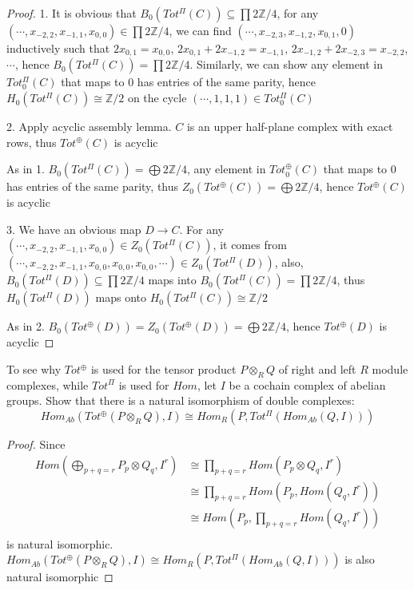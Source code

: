 \documentclass{article}
\newenvironment{exercise}[2][Exercise]{\begin{trivlist}
\item[\hskip \labelsep {\bfseries #1}\hskip \labelsep {\bfseries #2.}]}{\end{trivlist}}
\theoremstyle{definition}
\theoremstyle{remark}
\theoremstyle{definition}
\begin{document}
\begin{proof}
1. It is obvious that $B_0(Tot^\Pi(C))\subseteq\prod2\mathbb Z/4$, for any $(\cdots,x_{-2,2},x_{-1,1},x_{0,0})\in\prod2\mathbb Z/4$, we can find $(\cdots,x_{-2,3},x_{-1,2},x_{0,1},0)$ inductively such that $2x_{0,1}=x_{0,0}$, $2x_{0,1}+2x_{-1,2}=x_{-1,1}$, $2x_{-1,2}+2x_{-2,3}=x_{-2,2}$, $\cdots$, hence $B_0(Tot^\Pi(C))=\prod2\mathbb Z/4$. Similarly, we can show any element in $Tot^\Pi_0(C)$ that maps to $0$ has entries of the same parity, hence $H_0(Tot^\Pi(C))\cong\mathbb Z/2$ on the cycle $(\cdots,1,1,1)\in Tot^\Pi_0(C)$ \par
2. Apply acyclic assembly lemma. $C$ is an upper half-plane complex with exact rows, thus $Tot^\oplus(C)$ is acyclic \par
As in 1. $B_0(Tot^\Pi(C))=\bigoplus 2\mathbb Z/4$, any element in $Tot^\oplus_0(C)$ that maps to $0$ has entries of the same parity, thus $Z_0(Tot^\oplus(C))=\bigoplus 2\mathbb Z/4$, hence $Tot^\oplus(C)$ is acyclic \par
3. We have an obvious map $D\to C$. For any $(\cdots,x_{-2,2},x_{-1,1},x_{0,0})\in Z_0(Tot^\Pi(C))$, it comes from $(\cdots,x_{-2,2},x_{-1,1},x_{0,0},x_{0,0},x_{0,0},\cdots)\in Z_0(Tot^\Pi(D))$, also, $B_0(Tot^\Pi(D))\subseteq\prod2\mathbb Z/4$ maps into $B_0(Tot^\Pi(C))=\prod2\mathbb Z/4$, thus  $H_0(Tot^\Pi(D))$ maps onto $H_0(Tot^\Pi(C))\cong\mathbb Z/2$ \par
As in 2. $B_0(Tot^\oplus(D))=Z_0(Tot^\oplus(D))=\bigoplus 2\mathbb Z/4$, hence $Tot^\oplus(D)$ is acyclic 
\end{proof}

\begin{exercise}{\textbf{2.7.3}}
To see why $Tot^\oplus$ is used for the tensor product $P\otimes_R Q$ of right and left $R$ module complexes, while $Tot^\Pi$ is used for $Hom$, let $I$ be a cochain complex of abelian groups. Show that there is a natural isomorphism of double complexes:
\[Hom_{Ab}(Tot^\oplus(P\otimes_RQ),I)\cong Hom_R(P,Tot^\Pi(Hom_{Ab}(Q,I)))\]
\end{exercise}

\begin{proof}
Since
\begin{align*}
Hom\left(\bigoplus_{p+q=r} P_p\otimes Q_q,I^r\right)&\cong \prod_{p+q=r} Hom\left(P_p\otimes Q_q,I^r\right) \\
&\cong \prod_{p+q=r} Hom\left(P_p,Hom(Q_q,I^r)\right) \\
&\cong Hom\left(P_p,\prod_{p+q=r}Hom(Q_q,I^r)\right) \\
\end{align*}
is natural isomorphic. $Hom_{Ab}(Tot^\oplus(P\otimes_RQ),I)\cong Hom_R(P,Tot^\Pi(Hom_{Ab}(Q,I)))$ is also natural isomorphic
\end{proof}
\end{document}
